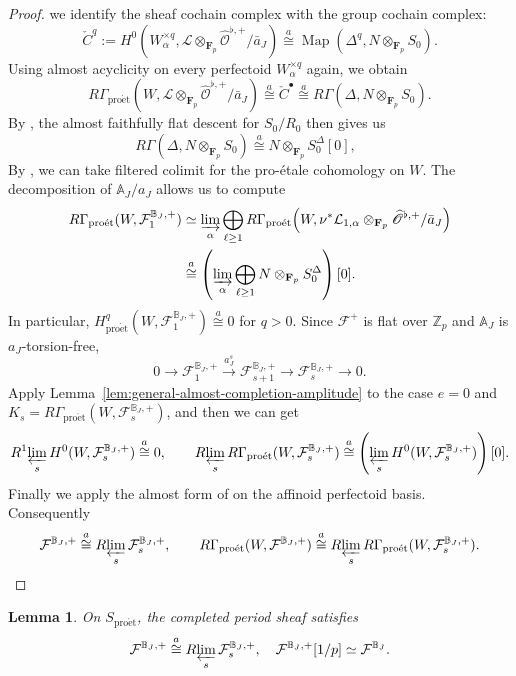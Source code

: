 \documentclass[11pt]{article}
\newtheorem{lemma}[theorem]{Lemma}
\theoremstyle{definition}
\newcommand{\Zp}{\mathbb Z_p}
\newcommand{\proet}{\mathrm{pro\acute et}}
\newcommand{\acong}{\mathrel{\overset{a}{\cong}}}
\begin{document}
\begin{proof}
we identify the sheaf cochain complex with the group cochain complex:
\[
 \check C^q:=
 H^0\!\left(W_\alpha^{\times q},\mathcal L\otimes_{\mathbf F_p}
       \widehat{\mathscr O}^{\flat,+}/\bar{a}_J\right)
 \acong\operatorname{Map}(\Delta^q,N\otimes_{\mathbf F_p}S_0).
\]
Using almost acyclicity on every perfectoid $W_\alpha^{\times q}$ again, we obtain
\[
 R\Gamma_{\proet}\!\left(W,
   \mathcal L\otimes_{\mathbf F_p}
       \widehat{\mathscr O}^{\flat,+}/\bar{a}_J\right)
 \acong\check C^\bullet
 \acong R\Gamma(\Delta,N\otimes_{\mathbf F_p}S_0).
\]
By \cite[proof of Lemma~4.12]{ScholzeRigid}, 
the almost faithfully flat descent for $S_0/R_0$
then gives us
\[
 R\Gamma(\Delta,N\otimes_{\mathbf F_p}S_0)\acong N\otimes_{\mathbf F_p}S_0^\Delta[0],\qquad
\]
By \cite[Proposition~3.12 and Lemma~4.10]{ScholzeRigid}, 
we can take filtered colimit for the pro-\'etale cohomology on $W$.  
The decomposition of $\mathbb{A}_J/a_J$ allows us to compute 
\begin{align*}
 R\Gamma_{\proet}(W,\mathcal F_1^{\mathbb B_J,+})
 &\simeq\varinjlim_\alpha\bigoplus_{\ell\ge1}
 R\Gamma_{\proet}\!\left(W,
 \nu^*\mathcal L_{1,\alpha}\otimes_{\mathbf F_p}
       \widehat{\mathscr O}^{\flat,+}/\bar{a}_J\right)\\
 &\acong\left(\varinjlim_\alpha\bigoplus_{\ell\ge1}
 N\otimes_{\mathbf F_p}S_0^\Delta\right)[0].
\end{align*}
In particular, $H^q_{\proet}(W,\mathcal F_1^{\mathbb B_J,+})\acong0$ for $q>0$.
Since $\mathcal F^+$ is flat over $\Zp$ and $\mathbb{A}_J$ is
$a_J$-torsion-free,
\[
 0\longrightarrow\mathcal F_1^{\mathbb B_J,+}
 \xrightarrow{a_J^s}\mathcal F_{s+1}^{\mathbb B_J,+}
 \longrightarrow\mathcal F_s^{\mathbb B_J,+}\longrightarrow0.
\]
Apply Lemma~\ref{lem:general-almost-completion-amplitude} to the case
\(e=0\) and \(K_s=R\Gamma_{\proet}(W,\mathcal F_s^{\mathbb B_J,+})\), and then we can get
\[
 R^1\!\varprojlim_s H^0(W,\mathcal F_s^{\mathbb B_J,+})\acong0,\qquad
 R\!\varprojlim_sR\Gamma_{\proet}(W,\mathcal F_s^{\mathbb B_J,+})
 \acong\left(\varprojlim_sH^0(W,\mathcal F_s^{\mathbb B_J,+})\right)[0].
\]
Finally we apply the almost form of \cite[Lemma~3.18]{ScholzeRigid}
on the affinoid perfectoid basis. Consequently 
\[
 \mathcal F^{\mathbb B_J,+}
 \acong R\!\varprojlim_s\mathcal F_s^{\mathbb B_J,+},\qquad
 R\Gamma_{\proet}(W,\mathcal F^{\mathbb B_J,+})
 \acong R\!\varprojlim_sR\Gamma_{\proet}(W,\mathcal F_s^{\mathbb B_J,+}).
\]
\end{proof}


\begin{lemma}
\label{lem:period-local-completion}
On \(S_{\proet}\), the completed period sheaf satisfies
\[
 \mathcal F^{\mathbb B_J,+}
 \acong R\!\varprojlim_s\mathcal F_s^{\mathbb B_J,+},
 \quad
 \mathcal F^{\mathbb B_J,+}[1/p]
 \simeq\mathcal F^{\mathbb B_J}.
\]
\end{lemma}
\end{document}
